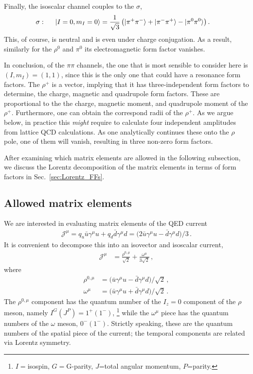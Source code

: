 Finally, the isoscalar channel couples to the $\sigma$,
\begin{align}
\sigma:\hspace{.5cm}|I=0,m_I=0\rangle&=\frac{1}{\sqrt{3}}\left(|\pi^+\pi^-\rangle+|\pi^-\pi^+\rangle-|\pi^0\pi^0\rangle\right).
\end{align}
This, of course, is neutral and is even under charge conjugation. As a result, similarly for the $\rho^0$ and $\pi^0$ its electromagnetic form factor vanishes. 

In conclusion, of the $\pi\pi$ channels, the one that is most sensible to consider here is $(I,m_I)=(1,1)$, since this is the only one that could have a resonance form factors. The $\rho^+$ is a vector, implying that it has three-independent form factors to determine, the charge, magnetic and quadrupole form factors. These are proportional to the the charge, magnetic moment, and quadrupole moment of the $\rho^+$. Furthermore, one can obtain the correspond radii of the $\rho^+$. As we argue below, in practice this \emph{might} require to calculate four independent amplitudes from lattice QCD calculations. As one analytically continues these onto the $\rho$ pole, one of them will vanish, resulting in three non-zero form factors. 


After examining which matrix elements are allowed in the following subsection, we discuss the Lorentz decomposition of the matrix elements in terms of form factors in Sec.~\ref{sec:Lorentz_FFs}.

 \subsection{Allowed matrix elements}

We are interested in evaluating matrix elements of the QED current
\begin{align}
{\mathcal{J}}^{\mu}=q_u\bar{u}\gamma^\mu u+q_d\bar{d}\gamma^\mu d= \big (2\bar{u}\gamma^\mu u-\bar{d}\gamma^\mu d \big )/3 \,.
\end{align} 
It is convenient to decompose this into an isovector and isoscalar current, 
\begin{align}
{\mathcal{J}}^{\mu}&=\frac{ \rho^{0,\mu}}{\sqrt{2}}+\frac{\omega^{\mu}}{3\sqrt{2}} \,,
\end{align}
where
\begin{align}
\rho^{0,\mu}&= \big ( \bar{u}\gamma^\mu u-\bar{d}\gamma^\mu d \big )/\sqrt{2} \,,\\
\omega^{\mu}&= \big (\bar{u}\gamma^\mu u+\bar{d}\gamma^\mu d \big )/\sqrt{2} \,.
\end{align} 
The $\rho^{0,\mu}$ component has the quantum number of the $I_z=0$ component of the $\rho$ meson, namely $I^G(J^{P})=1^{+}(1^{-})$,%
\footnote{$I=$isospin, $G=$G-parity, $J$=total angular momentum, $P$=parity.}
while the $\omega^{\mu}$ piece has the quantum numbers of the $\omega$ meson, $0^{-}(1^{-})$. Strictly speaking, these are the quantum numbers of the spatial piece of the current; the temporal components are related via Lorentz symmetry. 



